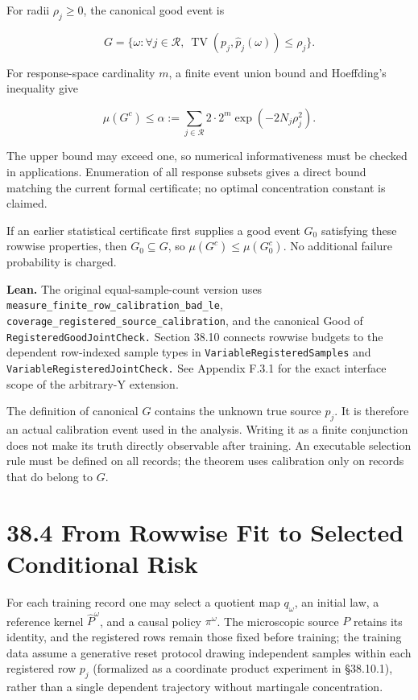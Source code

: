 \documentclass[
  english,
  11pt,
  oneside]{book}
\begin{document}
For radii \(\rho_j\ge0\), the canonical good event is

\[G=\{\omega:\forall j\in\mathcal R,\
\operatorname{TV}(p_j,\widehat p_j(\omega))\le\rho_j\}.\]

For response-space cardinality \(m\), a finite event union bound and Hoeffding's inequality give

\[\mu(G^c)\le
\alpha:=\sum_{j\in\mathcal R}
2\cdot2^m\exp(-2N_j\rho_j^2).\]

The upper bound may exceed one, so numerical informativeness must be checked in applications. Enumeration of all response subsets gives a direct bound matching the current formal certificate; no optimal concentration constant is claimed.

If an earlier statistical certificate first supplies a good event \(G_0\) satisfying these rowwise properties, then \(G_0\subseteq G\), so \(\mu(G^c)\le\mu(G_0^c)\). No additional failure probability is charged.

\textbf{Lean.} The original equal-sample-count version uses \nolinkurl{measure_finite_row_calibration_bad_le}, \nolinkurl{coverage_registered_source_calibration}, and the canonical Good of \nolinkurl{RegisteredGoodJointCheck.} Section 38.10 connects rowwise budgets to the dependent row-indexed sample types in \nolinkurl{VariableRegisteredSamples} and \nolinkurl{VariableRegisteredJointCheck.} See Appendix F.3.1 for the exact interface scope of the arbitrary-Y extension.

The definition of canonical \(G\) contains the unknown true source \(p_j\). It is therefore an actual calibration event used in the analysis. Writing it as a finite conjunction does not make its truth directly observable after training. An executable selection rule must be defined on all records; the theorem uses calibration only on records that do belong to \(G\).

\section{38.4 From Rowwise Fit to Selected Conditional Risk}\label{from-rowwise-fit-to-selected-conditional-risk}

For each training record one may select a quotient map \(q_\omega\), an initial law, a reference kernel \(\widehat P^\omega\), and a causal policy \(\pi^\omega\). The microscopic source \(P\) retains its identity, and the registered rows remain those fixed before training; the training data assume a generative reset protocol drawing independent samples within each registered row \(p_j\) (formalized as a coordinate product experiment in §38.10.1), rather than a single dependent trajectory without martingale concentration.
\end{document}

